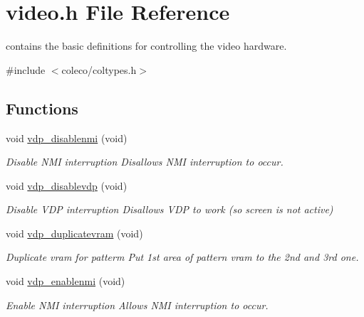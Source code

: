 \hypertarget{a00056}{}\section{video.\+h File Reference}
\label{a00056}


contains the basic definitions for controlling the video hardware.  


{\ttfamily \#include $<$coleco/coltypes.\+h$>$}\newline
\subsection*{Functions}
\begin{DoxyCompactItemize}
\item 
\mbox{\label{a00056_a556fbfbc86f53ebce1cd33b75508a30b}} 
void \hyperlink{a00056_a556fbfbc86f53ebce1cd33b75508a30b}{vdp\+\_\+disablenmi} (void)
\begin{DoxyCompactList}\small\item\em Disable N\+MI interruption Disallows N\+MI interruption to occur. \end{DoxyCompactList}\item 
\mbox{\label{a00056_a52fcf46fb1e68b8fcc6f1f7c8eba5e72}} 
void \hyperlink{a00056_a52fcf46fb1e68b8fcc6f1f7c8eba5e72}{vdp\+\_\+disablevdp} (void)
\begin{DoxyCompactList}\small\item\em Disable V\+DP interruption Disallows V\+DP to work (so screen is not active) \end{DoxyCompactList}\item 
\mbox{\label{a00056_acbc0235fb1623e08b2afa3345a81206e}} 
void \hyperlink{a00056_acbc0235fb1623e08b2afa3345a81206e}{vdp\+\_\+duplicatevram} (void)
\begin{DoxyCompactList}\small\item\em Duplicate vram for patterm Put 1st area of pattern vram to the 2nd and 3rd one. \end{DoxyCompactList}\item 
\mbox{\label{a00056_acfc547ddc2c924a276f1ee0351751102}} 
void \hyperlink{a00056_acfc547ddc2c924a276f1ee0351751102}{vdp\+\_\+enablenmi} (void)
\begin{DoxyCompactList}\small\item\em Enable N\+MI interruption Allows N\+MI interruption to occur. \end{DoxyCompactList}\item 

\end{DoxyCompactItemize}
